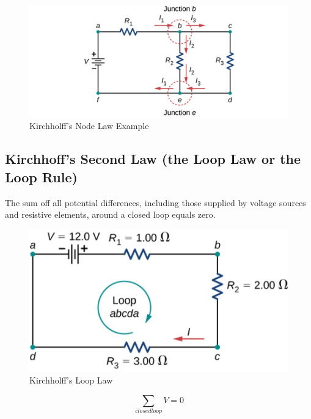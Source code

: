 \documentclass[14pt]{memoir}
\begin{document}
\begin{figure}[H]
\begin{center}
\includegraphics[scale=0.50]{fig/fig_10_24.jpg}
\caption{Kirchholff's Node Law Example}
\label{fig:10_24}
\end{center}
\end{figure}

\subsection{Kirchhoff's Second Law (the Loop Law or the Loop Rule)}

The sum off all potential differences, including those supplied by voltage sources and resistive elements, around a closed loop equals zero.

\begin{figure}[H]
\begin{center}
\includegraphics[scale=0.50]{fig/fig_10_21.jpg}
\caption{Kirchholff's Loop Law}
\label{fig:10_21}
\end{center}
\end{figure}

\begin{equation}
\sum_{closed loop} V = 0
\end{equation}
\end{document}
